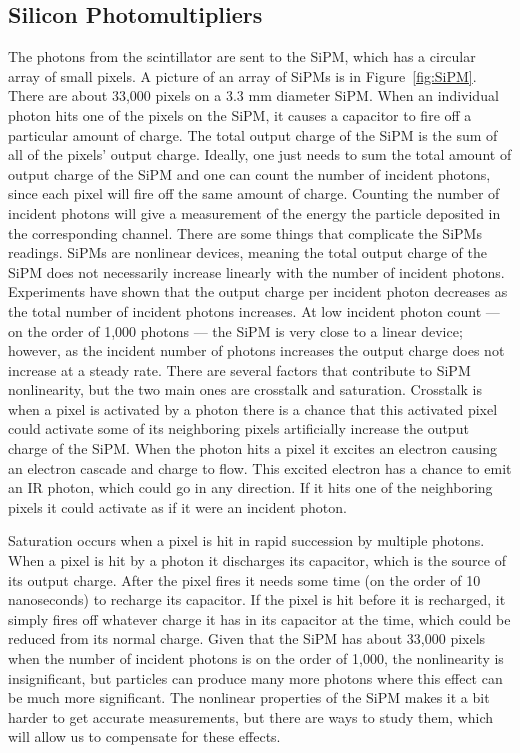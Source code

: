 \subsection{Silicon Photomultipliers}
The photons from the scintillator are sent to the SiPM, which has a circular array of small pixels. A picture of an array of SiPMs is in Figure~\ref{fig:SiPM}. There are about 33,000 pixels on a 3.3 mm diameter SiPM. When an individual photon hits one of the pixels on the SiPM, it causes a capacitor to fire off a particular amount of charge. The total output charge of the SiPM is the sum of all of the pixels' output charge. Ideally, one just needs to sum the total amount of output charge of the SiPM and one can count the number of incident photons, since each pixel will fire off the same amount of charge. Counting the number of incident photons will give a measurement of the energy the particle deposited in the corresponding channel. There are some things that complicate the SiPMs readings. SiPMs are nonlinear devices, meaning the total output charge of the SiPM does not necessarily increase linearly with the number of incident photons. Experiments have shown that the output charge per incident photon decreases as the total number of incident photons increases. At low incident photon count --- on the order of 1,000 photons --- the SiPM is very close to a linear device; however, as the incident number of photons increases the output charge does not increase at a steady rate. There are several factors that contribute to SiPM nonlinearity, but the two main ones are crosstalk and saturation. Crosstalk is when a pixel is activated by a photon there is a chance that this activated pixel could activate some of its neighboring pixels artificially increase the output charge of the SiPM. When the photon hits a pixel it excites an electron causing an electron cascade and charge to flow. This excited electron has a chance to emit an IR photon, which could go in any direction. If it hits one of the neighboring pixels it could activate as if it were an incident photon. 

Saturation occurs when a pixel is hit in rapid succession by multiple photons. When a pixel is hit by a photon it discharges its capacitor, which is the source of its output charge. After the pixel fires it needs some time (on the order of 10 nanoseconds) to recharge its capacitor. If the pixel is hit before it is recharged, it simply fires off whatever charge it has in its capacitor at the time, which could be reduced from its normal charge. Given that the SiPM has about 33,000 pixels when the number of incident photons is on the order of 1,000, the nonlinearity is insignificant, but particles can produce many more photons where this effect can be much more significant. The nonlinear properties of the SiPM makes it a bit harder to get accurate measurements, but there are ways to study them, which will allow us to compensate for these effects.

